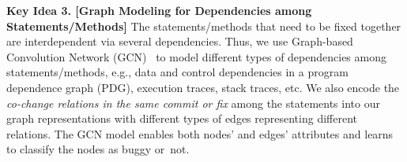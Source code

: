 {\bf Key Idea 3. [Graph Modeling for Dependencies among
    Statements/Methods]} The statements/methods that need to be fixed
together are interdependent via several dependencies. Thus, we use
Graph-based Convolution Network (GCN)~\cite{li2019gcn} to model
different types of dependencies among statements/methods,
e.g., data and control dependencies in a program dependence graph
(PDG), execution traces, stack traces, etc.
We also encode the {\em co-change relations in the same commit or fix}
  among the statements into our graph representations with different
types of edges representing different relations. The GCN model enables
both nodes' and edges' attributes and learns to classify the nodes as
buggy or~not.









